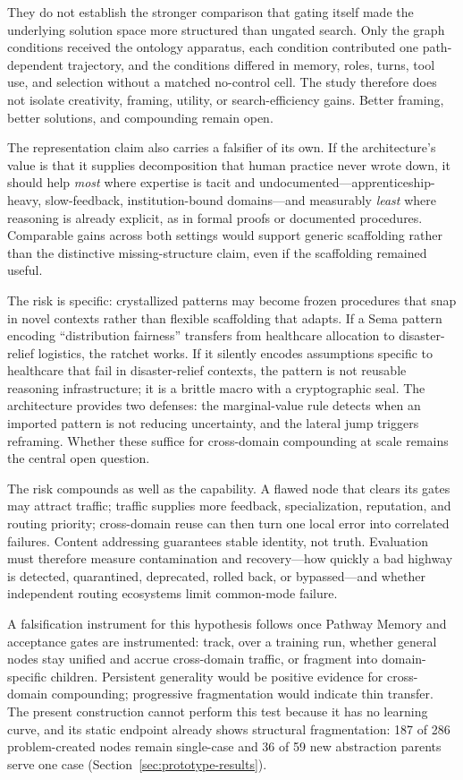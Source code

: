 \documentclass[11pt]{article}
\begin{document}
They do not establish the stronger comparison that gating itself made the underlying solution space more structured than ungated search. Only the graph conditions received the ontology apparatus, each condition contributed one path-dependent trajectory, and the conditions differed in memory, roles, turns, tool use, and selection without a matched no-control cell. The study therefore does not isolate creativity, framing, utility, or search-efficiency gains. Better framing, better solutions, and compounding remain open.

The representation claim also carries a falsifier of its own. If the architecture's value is that it supplies decomposition that human practice never wrote down, it should help \emph{most} where expertise is tacit and undocumented---apprenticeship-heavy, slow-feedback, institution-bound domains---and measurably \emph{least} where reasoning is already explicit, as in formal proofs or documented procedures. Comparable gains across both settings would support generic scaffolding rather than the distinctive missing-structure claim, even if the scaffolding remained useful.

The risk is specific: crystallized patterns may become frozen procedures that snap in novel contexts rather than flexible scaffolding that adapts. If a Sema pattern encoding ``distribution fairness'' transfers from healthcare allocation to disaster-relief logistics, the ratchet works. If it silently encodes assumptions specific to healthcare that fail in disaster-relief contexts, the pattern is not reusable reasoning infrastructure; it is a brittle macro with a cryptographic seal. The architecture provides two defenses: the marginal-value rule detects when an imported pattern is not reducing uncertainty, and the lateral jump triggers reframing. Whether these suffice for cross-domain compounding at scale remains the central open question.

The risk compounds as well as the capability. A flawed node that clears its gates may attract traffic; traffic supplies more feedback, specialization, reputation, and routing priority; cross-domain reuse can then turn one local error into correlated failures. Content addressing guarantees stable identity, not truth. Evaluation must therefore measure contamination and recovery---how quickly a bad highway is detected, quarantined, deprecated, rolled back, or bypassed---and whether independent routing ecosystems limit common-mode failure.

A falsification instrument for this hypothesis follows once Pathway Memory and acceptance gates are instrumented: track, over a training run, whether general nodes stay unified and accrue cross-domain traffic, or fragment into domain-specific children. Persistent generality would be positive evidence for cross-domain compounding; progressive fragmentation would indicate thin transfer. The present construction cannot perform this test because it has no learning curve, and its static endpoint already shows structural fragmentation: 187 of 286 problem-created nodes remain single-case and 36 of 59 new abstraction parents serve one case (Section~\ref{sec:prototype-results}).
\end{document}
